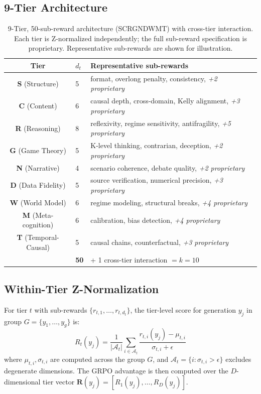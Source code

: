 \documentclass[sigconf]{acmart}
\begin{document}
\subsection{9-Tier Architecture}

\begin{table}[t]
\centering
\small
\caption{9-Tier, 50-sub-reward architecture (SCRGNDWMT) with cross-tier interaction. Each tier is Z-normalized independently; the full sub-reward specification is proprietary. Representative sub-rewards are shown for illustration.}
\label{tab:tiers}
\begin{tabular}{@{}clp{4.2cm}@{}}
\toprule
\textbf{Tier} & \textbf{$d_t$} & \textbf{Representative sub-rewards} \\
\midrule
\textbf{S} (Structure) & 5 & format, overlong penalty, consistency, \textit{+2 proprietary} \\
\textbf{C} (Content) & 6 & causal depth, cross-domain, Kelly alignment, \textit{+3 proprietary} \\
\textbf{R} (Reasoning) & 8 & reflexivity, regime sensitivity, antifragility, \textit{+5 proprietary} \\
\textbf{G} (Game Theory) & 5 & K-level thinking, contrarian, deception, \textit{+2 proprietary} \\
\textbf{N} (Narrative) & 4 & scenario coherence, debate quality, \textit{+2 proprietary} \\
\textbf{D} (Data Fidelity) & 5 & source verification, numerical precision, \textit{+3 proprietary} \\
\textbf{W} (World Model) & 6 & regime modeling, structural breaks, \textit{+4 proprietary} \\
\textbf{M} (Meta-cognition) & 6 & calibration, bias detection, \textit{+4 proprietary} \\
\textbf{T} (Temporal-Causal) & 5 & causal chains, counterfactual, \textit{+3 proprietary} \\
\midrule
 & \textbf{50} & + 1 cross-tier interaction $= k{=}10$ \\
\bottomrule
\end{tabular}
\end{table}

\subsection{Within-Tier Z-Normalization}

For tier $t$ with sub-rewards $\{r_{t,1}, \ldots, r_{t,d_t}\}$, the tier-level score for generation $y_j$ in group $G = \{y_1, \ldots, y_g\}$ is:
\begin{equation}
    R_t(y_j) = \frac{1}{|\mathcal{A}_t|} \sum_{i \in \mathcal{A}_t} \frac{r_{t,i}(y_j) - \mu_{t,i}}{\sigma_{t,i} + \epsilon}
    \label{eq:tier}
\end{equation}
where $\mu_{t,i}, \sigma_{t,i}$ are computed across the group $G$, and $\mathcal{A}_t = \{i : \sigma_{t,i} > \epsilon\}$ excludes degenerate dimensions. The GRPO advantage is then computed over the $D$-dimensional tier vector $\mathbf{R}(y_j) = [R_1(y_j), \ldots, R_D(y_j)]$.
\end{document}
